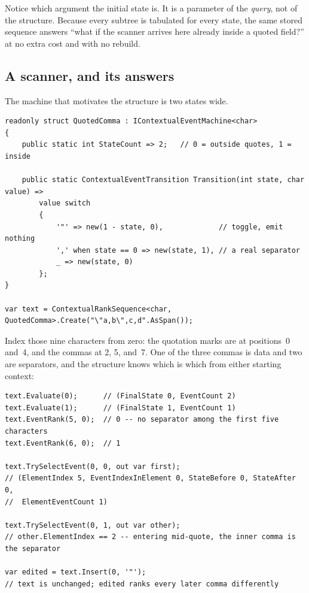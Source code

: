 \documentclass[11pt,twoside,openright]{book}
\begin{document}
Notice which argument the initial state is. It is a parameter of the
\emph{query}, not of the structure. Because every subtree is tabulated for every
state, the same stored sequence answers ``what if the scanner arrives here
already inside a quoted field?'' at no extra cost and with no rebuild.

\subsection{A scanner, and its answers}

The machine that motivates the structure is two states wide.

\begin{lstlisting}[language={[Sharp]C}]
readonly struct QuotedComma : IContextualEventMachine<char>
{
    public static int StateCount => 2;   // 0 = outside quotes, 1 = inside

    public static ContextualEventTransition Transition(int state, char value) =>
        value switch
        {
            '"' => new(1 - state, 0),             // toggle, emit nothing
            ',' when state == 0 => new(state, 1), // a real separator
            _ => new(state, 0)
        };
}

var text = ContextualRankSequence<char, QuotedComma>.Create("\"a,b\",c,d".AsSpan());
\end{lstlisting}

\noindent
Index those nine characters from zero: the quotation marks are at positions~0
and~4, and the commas at 2, 5, and~7. One of the three commas is data and two are
separators, and the structure knows which is which from either starting context:

\begin{lstlisting}[language={[Sharp]C}]
text.Evaluate(0);      // (FinalState 0, EventCount 2)
text.Evaluate(1);      // (FinalState 1, EventCount 1)
text.EventRank(5, 0);  // 0 -- no separator among the first five characters
text.EventRank(6, 0);  // 1

text.TrySelectEvent(0, 0, out var first);
// (ElementIndex 5, EventIndexInElement 0, StateBefore 0, StateAfter 0,
//  ElementEventCount 1)

text.TrySelectEvent(0, 1, out var other);
// other.ElementIndex == 2 -- entering mid-quote, the inner comma is the separator

var edited = text.Insert(0, '"');
// text is unchanged; edited ranks every later comma differently
\end{lstlisting}
\end{document}

